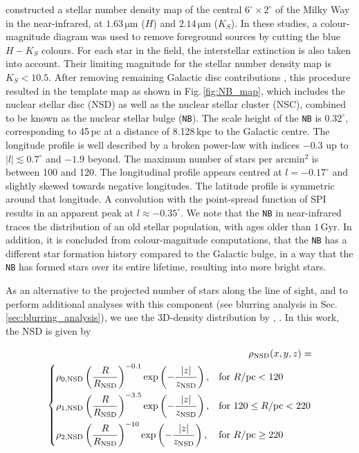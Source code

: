 \documentclass[doublespace,draft,nopageskip]{VTthesis} %
\newcommand{\mrm}[1]{\mathrm{#1}}
\begin{document}
\begin{appendices}
	\citet{Nishiyama2013_NuclearBulge_PlasmaMagnet} constructed a stellar number density map of the central $6^{\circ} \times 2^{\circ}$ of the Milky Way in the near-infrared, at $1.63\,\mrm{\mu m}$ ($H$) and $2.14\,\mrm{\mu m}$ ($K_S$).
	In these studies, a colour-magnitude diagram was used to remove foreground sources by cutting the blue $H-K_S$ colours.
	For each star in the field, the interstellar extinction is also taken into account.
	Their limiting magnitude for the stellar number density map is $K_S<10.5$.
	After removing remaining Galactic disc contributions \citep{Macias2018_LATGeV}, this procedure resulted in the template map as shown in Fig.\,\ref{fig:NB_map}, which includes the nuclear stellar disc (NSD) as well as the nuclear stellar cluster (NSC), combined to be known as the nuclear stellar bulge (\texttt{NB}).
	The scale height of the \texttt{NB} is $0.32^{\circ}$, corresponding to 45\,pc at a distance of 8.128\,kpc to the Galactic centre.
	The longitude profile is well described by a broken power-law with indices $-0.3$ up to $|l| \lesssim 0.7^{\circ}$ and $-1.9$ beyond.
	The maximum number of stars per $\mrm{arcmin^2}$ is between 100 and 120.
	The longitudinal profile appears centred at $l=-0.17^{\circ}$ and slightly skewed towards negative longitudes.
	The latitude profile is symmetric around that longitude.
	A convolution with the point-spread function of SPI results in an apparent peak at $l \approx -0.35^{\circ}$.
	We note that the \texttt{NB} in near-infrared traces the distribution of an old stellar population, with ages older than $1\,\mrm{Gyr}$.
	In addition, it is concluded from colour-magnitude computations, that the \texttt{NB} has a different star formation history compared to the Galactic bulge, in a way that the \texttt{NB} has formed stars over its entire lifetime, resulting into more bright stars.
	
	As an alternative to the projected number of stars along the line of sight, and to perform additional analyses with this component (see blurring analysis in Sec.\,\ref{sec:blurring_analysis}), we use the 3D-density distribution by \citet{Launhardt2002_NB}, \citep[see also][]{Bartels2018_GeVexcess_stars}.
	In this work, the NSD is given by
	
	\begin{eqnarray}
		\rho_{\rm NSD}(x,y,z) = & \\\nonumber \left \{
		\begin{aligned}
			&\rho_{0,\rm NSD} \left(\frac{R}{R_{\rm NSD}}\right)^{-0.1} \exp\left(-\frac{|z|}{z_{\rm NSD}}\right), && \text{for}\ R/\mrm{pc} < 120 \\
			&\rho_{1,\rm NSD} \left(\frac{R}{R_{\rm NSD}}\right)^{-3.5} \exp\left(-\frac{|z|}{z_{\rm NSD}}\right), && \text{for}\ 120 \leq R/\mrm{pc} < 220 \\
			&\rho_{2,\rm NSD} \left(\frac{R}{R_{\rm NSD}}\right)^{-10} \exp\left(-\frac{|z|}{z_{\rm NSD}}\right), && \text{for}\ R/\mrm{pc} \geq 220 
		\end{aligned} \right. &
		\label{eq:NSD_formula}
	\end{eqnarray} 
	

\end{appendices}
\end{document}
